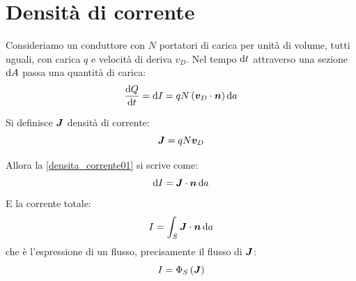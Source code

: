 \section{Densità di corrente}
Consideriamo un conduttore con $N$ portatori di carica per unità di volume, tutti uguali, con carica $q$ e velocità di deriva $v_D$. Nel tempo $\mathrm{d} t$ attraverso una sezione $\mathrm{d} A$ passa una quantità di carica:
\begin{equation}
\frac{\mathrm{d} Q}{\mathrm{d} t}=\mathrm{d} I=qN\left(\boldsymbol{v}_D\cdot \boldsymbol{n}\right)\mathrm{d} a
\label{densita_corrente01}
\end{equation}
\begin{Def}
Si definisce $\boldsymbol{J}$ densità di corrente:
\begin{equation}
\boldsymbol{J}=qN\boldsymbol{v}_D
\end{equation}
\end{Def}
Allora la \eqref{densita_corrente01} si scrive come:
\begin{equation*}\mathrm{d} I=\boldsymbol{J}\cdot\boldsymbol{n}\,\mathrm{d} a\end{equation*}
E la corrente totale:
\begin{equation}
I=\int_S \boldsymbol{J}\cdot \boldsymbol{n}\,\mathrm{d} a
\end{equation}
che è l'espressione di un flusso, precisamente il flusso di $\boldsymbol{J}$:
\begin{equation}
I=\Phi_S\left(\boldsymbol{J}\right)
\end{equation}

